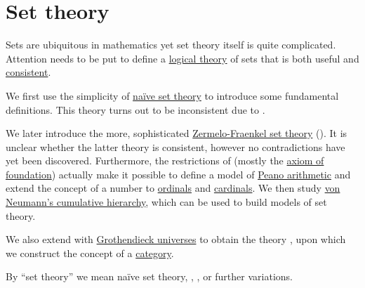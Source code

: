 \section{Set theory}\label{sec:set_theory}

Sets are ubiquitous in mathematics yet set theory itself is quite complicated. Attention needs to be put to define a \hyperref[def:first_order_theory]{logical theory} of sets that is both useful and \hyperref[def:first_order_theory_consistency]{consistent}.

We first use the simplicity of \hyperref[def:naive_set_theory]{na\"ive set theory} to introduce some fundamental definitions. This theory turns out to be inconsistent due to .

We later introduce the more, sophisticated \hyperref[def:zfc]{Zermelo-Fraenkel set theory} (). It is unclear whether the latter theory is consistent, however no contradictions have yet been discovered. Furthermore, the restrictions of  (mostly the \hyperref[def:zfc/foundation]{axiom of foundation}) actually make it possible to define a model of \hyperref[def:peano_arithmetic]{Peano arithmetic} and extend the concept of a number to \hyperref[def:ordinal]{ordinals} and \hyperref[def:cardinal]{cardinals}. We then study \hyperref[def:cumulative_hierarchy]{von Neumann's cumulative hierarchy}, which can be used to build models of set theory.

We also extend  with \hyperref[def:grothendieck_universe]{Grothendieck universes} to obtain the theory \hyperref[def:axiom_of_universes]{}, upon which we construct the concept of a \hyperref[def:category]{category}.

By \enquote{set theory} we mean na\"ive set theory, , ,  or further variations.

